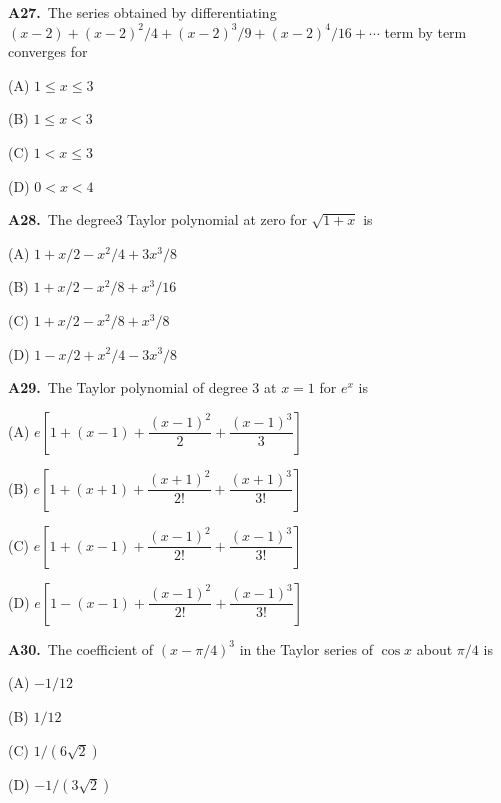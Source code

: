 \documentclass[11pt]{article}
\begin{document}
\bigskip\noindent\textbf{A27.}\ The series obtained by differentiating $(x-2)+(x-2)^2/4+(x-2)^3/9+(x-2)^4/16+\cdots$ term by term converges for
\begin{list}{}{\setlength{\leftmargin}{3em}\setlength{\labelwidth}{2.5em}\setlength{\itemsep}{0pt}\setlength{\topsep}{2pt}}
\item[(A)] $1\leq x\leq3$
\item[(B)] $1\leq x<3$
\item[(C)] $1<x\leq3$
\item[(D)] $0<x<4$
\end{list}

\bigskip\noindent\textbf{A28.}\ The degree3 Taylor polynomial at zero for $\sqrt{1+x}$ is
\begin{list}{}{\setlength{\leftmargin}{3em}\setlength{\labelwidth}{2.5em}\setlength{\itemsep}{0pt}\setlength{\topsep}{2pt}}
\item[(A)] $1+x/2-x^2/4+3x^3/8$
\item[(B)] $1+x/2-x^2/8+x^3/16$
\item[(C)] $1+x/2-x^2/8+x^3/8$
\item[(D)] $1-x/2+x^2/4-3x^3/8$
\end{list}

\bigskip\noindent\textbf{A29.}\ The Taylor polynomial of degree 3 at $x=1$ for $e^x$ is
\begin{list}{}{\setlength{\leftmargin}{3em}\setlength{\labelwidth}{2.5em}\setlength{\itemsep}{0pt}\setlength{\topsep}{2pt}}
\item[(A)] $e\left[1+(x-1)+\dfrac{(x-1)^2}{2}+\dfrac{(x-1)^3}{3}\right]$
\item[(B)] $e\left[1+(x+1)+\dfrac{(x+1)^2}{2!}+\dfrac{(x+1)^3}{3!}\right]$
\item[(C)] $e\left[1+(x-1)+\dfrac{(x-1)^2}{2!}+\dfrac{(x-1)^3}{3!}\right]$
\item[(D)] $e\left[1-(x-1)+\dfrac{(x-1)^2}{2!}+\dfrac{(x-1)^3}{3!}\right]$
\end{list}

\bigskip\noindent\textbf{A30.}\ The coefficient of $(x-\pi/4)^3$ in the Taylor series of $\cos x$ about $\pi/4$ is
\begin{list}{}{\setlength{\leftmargin}{3em}\setlength{\labelwidth}{2.5em}\setlength{\itemsep}{0pt}\setlength{\topsep}{2pt}}
\item[(A)] $-1/12$
\item[(B)] $1/12$
\item[(C)] $1/(6\sqrt2)$
\item[(D)] $-1/(3\sqrt2)$
\end{list}
\end{document}
